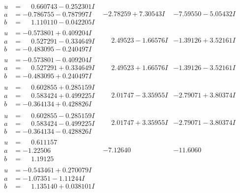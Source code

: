 \documentclass[1p]{elsarticle_modified}
\theoremstyle{definition}
\begin{document}
$$\begin{array}{c|c|c}
\begin{aligned}
u &= \phantom{-}0.660743 - 0.252301 I \\
a &= -0.786755 - 0.787997 I \\
b &= \phantom{-}1.110110 - 0.042205 I\end{aligned}
 & -2.78259 + 7.30543 I & -7.59550 - 5.05432 I \\ \hline\begin{aligned}
u &= -0.573801 + 0.409204 I \\
a &= \phantom{-}0.527291 - 0.334649 I \\
b &= -0.483095 - 0.240497 I\end{aligned}
 & \phantom{-}2.49523 - 1.66576 I & -1.39126 + 3.52161 I \\ \hline\begin{aligned}
u &= -0.573801 - 0.409204 I \\
a &= \phantom{-}0.527291 + 0.334649 I \\
b &= -0.483095 + 0.240497 I\end{aligned}
 & \phantom{-}2.49523 + 1.66576 I & -1.39126 - 3.52161 I \\ \hline\begin{aligned}
u &= \phantom{-}0.602855 + 0.285159 I \\
a &= \phantom{-}0.583424 + 0.499225 I \\
b &= -0.364134 + 0.428826 I\end{aligned}
 & \phantom{-}2.01747 - 3.35955 I & -2.79071 + 3.80374 I \\ \hline\begin{aligned}
u &= \phantom{-}0.602855 - 0.285159 I \\
a &= \phantom{-}0.583424 - 0.499225 I \\
b &= -0.364134 - 0.428826 I\end{aligned}
 & \phantom{-}2.01747 + 3.35955 I & -2.79071 - 3.80374 I \\ \hline\begin{aligned}
u &= \phantom{-}0.611157\phantom{ +0.000000I} \\
a &= -1.22506\phantom{ +0.000000I} \\
b &= \phantom{-}1.19125\phantom{ +0.000000I}\end{aligned}
 & -7.12640\phantom{ +0.000000I} & -11.6060\phantom{ +0.000000I} \\ \hline\begin{aligned}
u &= -0.543461 + 0.270079 I \\
a &= -1.07351 - 1.11244 I \\
b &= \phantom{-}1.135140 + 0.038101 I\end{aligned}

\end{array}$$
\end{document}
